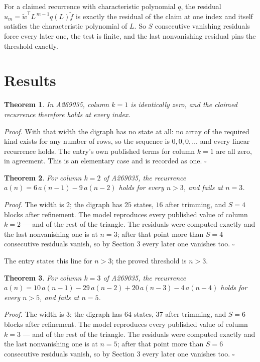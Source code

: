 \documentclass[11pt]{article}
\newtheorem{theorem}{Theorem}
\theoremstyle{definition}
\begin{document}
For a claimed recurrence with characteristic polynomial $q$, the residual $u_m = \tilde w^{\mathsf T}L^{\,m-1}q(L)\tilde f$ is exactly the residual of the claim at one index and itself satisfies the characteristic polynomial of $L$. So $S$ consecutive vanishing residuals force every later one, the test is finite, and the last nonvanishing residual pins the threshold exactly.

\section{Results}

\begin{theorem} In A269035, column $k = 1$ is identically zero, and the claimed recurrence therefore holds at every index.\end{theorem}

{\itshape Proof.} With that width the digraph has no state at all: no array of the required kind exists for any number of rows, so the sequence is $0,0,0,\dots$ and every linear recurrence holds. The entry's own published terms for column $k = 1$ are all zero, in agreement. This is an elementary case and is recorded as one. $\square$

\begin{theorem} For column $k = 2$ of A269035, the recurrence $a(n) = 6\,a(n-1) - 9\,a(n-2)$ holds for every $n > 3$, and fails at $n = 3$.\end{theorem}

{\itshape Proof.} The width is $2$; the digraph has $25$ states, $16$ after trimming, and $S = 4$ blocks after refinement. The model reproduces every published value of column $k = 2$ --- and of the rest of the triangle. The residuals were computed exactly and the last nonvanishing one is at $n = 3$; after that point more than $S = 4$ consecutive residuals vanish, so by Section 3 every later one vanishes too. $\square$

The entry states this line for $n > 3$; the proved threshold is $n > 3$.

\begin{theorem} For column $k = 3$ of A269035, the recurrence $a(n) = 10\,a(n-1) - 29\,a(n-2) + 20\,a(n-3) - 4\,a(n-4)$ holds for every $n > 5$, and fails at $n = 5$.\end{theorem}

{\itshape Proof.} The width is $3$; the digraph has $64$ states, $37$ after trimming, and $S = 6$ blocks after refinement. The model reproduces every published value of column $k = 3$ --- and of the rest of the triangle. The residuals were computed exactly and the last nonvanishing one is at $n = 5$; after that point more than $S = 6$ consecutive residuals vanish, so by Section 3 every later one vanishes too. $\square$
\end{document}
